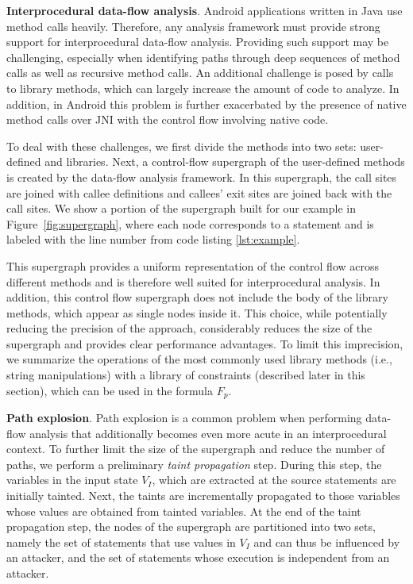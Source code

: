 \noindent
\textbf{Interprocedural data-flow analysis}. Android applications written in Java use method calls heavily. Therefore, any analysis framework must provide strong support for interprocedural data-flow analysis. Providing such support may be challenging, especially when identifying paths through deep sequences of method calls as well as recursive method calls. An additional challenge is posed by calls to library methods, which can largely increase the amount of code to analyze. In addition, in Android this problem is further exacerbated by the presence of native method calls over JNI with the control flow involving native code.

To deal with these challenges, we first divide the methods into two sets: user-defined and libraries. Next, a control-flow supergraph of the user-defined methods is created by the data-flow analysis framework. In this supergraph, the call sites are joined with callee definitions and callees' exit sites are joined back with the call sites. We show a portion of the supergraph built for our example in Figure~\ref{fig:supergraph}, where each node corresponds to a statement and is labeled with the line number from code listing \ref{lst:example}. 

This supergraph provides a uniform representation of the control flow across different methods and is therefore well suited for interprocedural analysis. In addition, this control flow supergraph does not include the body of the library methods, which appear as single nodes inside it. This choice, while potentially reducing the precision of the approach, considerably reduces the size of the supergraph and provides clear performance advantages. To limit this imprecision, we summarize the operations of the most commonly used library methods (i.e., string manipulations) with a library of constraints (described later in this section), which can be used in the formula $F_p$.

\noindent
\textbf{Path explosion}. Path explosion is a common problem when performing data-flow analysis that additionally becomes even more acute in an interprocedural context. To further limit the size of the supergraph and reduce the number of paths, we perform a preliminary \textit{taint propagation} step. During this step, the variables in the input state $V_I$, which are extracted at the source statements are initially tainted. Next, the taints are incrementally propagated to those variables whose values are obtained from tainted variables. At the end of the taint propagation step, the nodes of the supergraph are partitioned into two sets, namely the set of statements that use values in $V_I$ and can thus be influenced by an attacker, and the set of statements whose execution is independent from an attacker.

